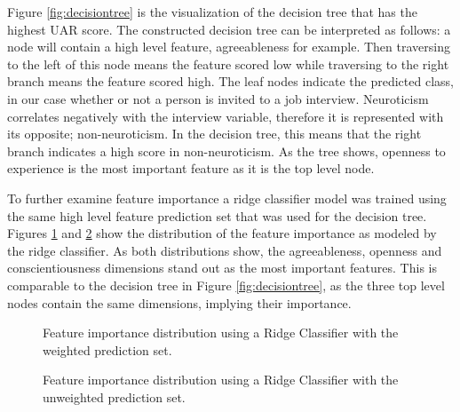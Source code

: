 Figure \ref{fig:decisiontree} is the visualization of the decision tree that has the highest UAR score. The constructed decision tree can be interpreted as follows: a node will contain a high level feature, agreeableness for example. Then traversing to the left of this node means the feature scored low while traversing to the right branch means the feature scored high. The leaf nodes indicate the predicted class, in our case whether or not a person is invited to a job interview. Neuroticism correlates negatively with the interview variable, therefore it is represented with its opposite; non-neuroticism. In the decision tree, this means that the right branch indicates a high score in non-neuroticism. As the tree shows, openness to experience is the most important feature as it is the top level node. 

\begin{figure*}[h]
  \centering
  
  \caption{Decision Tree of the personality traits, arousal and valence dimensions, predicting the interview invitation variable. Right branches are always labeled as HIGH, while left branches are always labeled as LOW.}
  \label{fig:decisiontree}
\end{figure*}

To further examine feature importance a ridge classifier model was trained using the same high level feature prediction set that was used for the decision tree. Figures \ref{fig:featureimp_weighted} and \ref{fig:featureimp_unweighted} show the distribution of the feature importance as modeled by the ridge classifier. As both distributions show, the agreeableness, openness and conscientiousness dimensions stand out as the most important features. This is comparable to the decision tree in Figure \ref{fig:decisiontree}, as the three top level nodes contain the same dimensions, implying their importance.  

\begin{figure}[h]
  \centering
  
  \caption{Feature importance distribution using a Ridge Classifier with the weighted prediction set.}
  \label{fig:featureimp_weighted}
\end{figure}

\begin{figure}[h]
  \centering
  
  \caption{Feature importance distribution using a Ridge Classifier with the unweighted prediction set.}
  \label{fig:featureimp_unweighted}
\end{figure}

